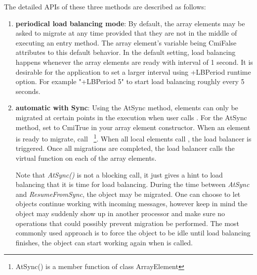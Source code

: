 
The detailed APIs of these three methods are described as follows:
\begin{enumerate}

\item {\bf periodical load balancing mode}: By default, the array elements 
may be asked to migrate at any time provided that they are not in 
the middle of executing an entry method. 
The array element's variable  being CmiFalse attributes
to this default behavior. In the default setting, load balancing happens
whenever the array elements are ready with interval of 1 second. It is 
desirable for the application to set a larger interval using +LBPeriod
runtime option. For example "+LBPeriod 5" to start load balancing roughly
every 5 seconds.

\item {\bf automatic with Sync}: Using the AtSync method, elements can 
only be migrated at certain points in the execution when user calls 
. 
For the AtSync method, set  to CmiTrue in your 
array element constructor.  When an element is ready to migrate,
call ~\footnote{AtSync() is a member function of class ArrayElement}.  
When all local elements call , the load balancer is triggered.  
Once all migrations are completed, the load balancer calls the 
virtual function  on each of the
array elements.  

Note that {\em AtSync()} is not a blocking call, it just gives a hint to load
balancing that it is time for load balancing. During the time between 
{\em AtSync} and {\em ResumeFromSync}, the object may be migrated. 
One can choose to let objects continue working with incoming messages,
however keep in mind the object may suddenly show up in another processor
and make sure no operations that could possibly prevent migration 
be performed. The most commonly used approach is to force the object to 
be idle until load balancing finishes, the object can start working again
when  is called.


\end{enumerate}
